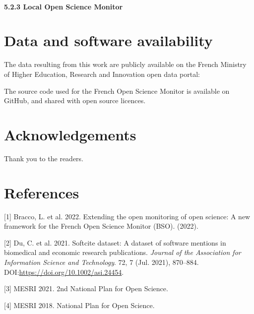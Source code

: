 \documentclass[
]{article}
\newenvironment{cslreferences}%
  {}%
  {\par}
\begin{document}
\hypertarget{local-open-science-monitor}{%
\paragraph{5.2.3 Local Open Science
Monitor}\label{local-open-science-monitor}}

\hypertarget{data-and-software-availability}{%
\section{Data and software
availability}\label{data-and-software-availability}}

The data resulting from this work are publicly available on the French
Ministry of Higher Education, Research and Innovation open data portal:

The source code used for the French Open Science Monitor is available on
GitHub, and shared with open source licences.

\hypertarget{acknowledgements}{%
\section{Acknowledgements}\label{acknowledgements}}

Thank you to the readers.

\hypertarget{references}{%
\section*{References}\label{references}}

\hypertarget{refs}{}
\begin{cslreferences}
\leavevmode\hypertarget{ref-bracco_extending_2022}{}%
{[}1{]} Bracco, L. et al. 2022. Extending the open monitoring of open
science: A new framework for the French Open Science Monitor (BSO).
(2022).

\leavevmode\hypertarget{ref-du_softcite_2021}{}%
{[}2{]} Du, C. et al. 2021. Softcite dataset: A dataset of software
mentions in biomedical and economic research publications. \emph{Journal
of the Association for Information Science and Technology}. 72, 7 (Jul.
2021), 870--884. DOI:\url{https://doi.org/10.1002/asi.24454}.

\leavevmode\hypertarget{ref-mesri_2nd_2021}{}%
{[}3{]} MESRI 2021. 2nd National Plan for Open Science.

\leavevmode\hypertarget{ref-mesri_national_2018}{}%
{[}4{]} MESRI 2018. National Plan for Open Science.
\end{cslreferences}
\end{document}
